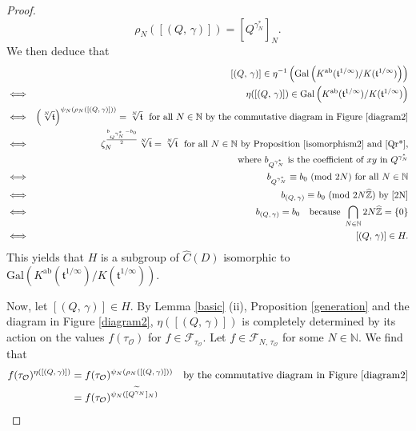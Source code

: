 \documentclass[reqno,11pt]{article}
\newcommand{\Mod}[1]{\ (\textup{mod}\ #1)}
\theoremstyle{plain} %
\theoremstyle{definition} %
\begin{document}
\begin{proof}
\begin{equation}
\rho_N([(Q,\,\gamma)])=
[Q^{\gamma^*_N}]_N. 
\end{equation}
We then deduce that
\begin{eqnarray*}
&&[(Q,\,\gamma)]\in\eta^{-1}\left(\mathrm{Gal}\left(K^\mathrm{ab}(\mathfrak{t}^{1/\infty})/K(\mathfrak{t}^{1/\infty})\right)\right)\\
&\Longleftrightarrow&\eta([(Q,\,\gamma)])\in\mathrm{Gal}\left(K^\mathrm{ab}(\mathfrak{t}^{1/\infty})/K(\mathfrak{t}^{1/\infty})\right)\\
&\Longleftrightarrow&\left(\sqrt[N]{\mathfrak{t}}\right)^{\psi_N(\rho_N([(Q,\,\gamma)]))}=\sqrt[N]{\mathfrak{t}}
~~\textrm{for all}~N\in\mathbb{N}~
\textrm{by the commutative diagram in Figure \ref{diagram2}}\\
&\Longleftrightarrow&\zeta_N^{\frac{b_{Q^{\gamma^*_N}}-b_0}{2}}\sqrt[N]{\mathfrak{t}}=\sqrt[N]{\mathfrak{t}}~~
\textrm{for all $N\in\mathbb{N}$ by Proposition \ref{isomorphism2} and \eqref{Qr*}},\\
&&\hspace{3.4cm}\textrm{where $b_{Q^{\gamma^*_N}}$
is the coefficient of $xy$ in $Q^{\gamma^*_N}$}\\
&\Longleftrightarrow&
b_{Q^{\gamma^*_N}}\equiv b_0\Mod{2N}~\textrm{for all}~N\in\mathbb{N}\\
&\Longleftrightarrow&b_{(Q,\,\gamma)}\equiv b_0\Mod{2N\widehat{\mathbb{Z}}}~\textrm{by \eqref{2N}}\\
&\Longleftrightarrow&b_{(Q,\,\gamma)}=b_0\quad
\textrm{because}~\bigcap_{N\in\mathbb{N}}2N\widehat{\mathbb{Z}}=\{0\}\\
&\Longleftrightarrow&[(Q,\,\gamma)]\in H. 
\end{eqnarray*}
This yields that
$H$ is a subgroup of $\widehat{C}(D)$ isomorphic to 
$\mathrm{Gal}\left(K^\mathrm{ab}(\mathfrak{t}^{1/\infty})/K(\mathfrak{t}^{1/\infty})\right)$. 
\par
Now, let $[(Q,\,\gamma)]\in H$. 
By Lemma \ref{basic} (ii), Proposition \ref{generation} and the diagram in
Figure \ref{diagram2}, $\eta([(Q,\,\gamma)])$ is completely determined by
its action on the values $f(\tau_{\mathcal{O}})$ for
$f\in\mathcal F_{\tau_{\mathcal O}}$.
Let $f\in\mathcal{F}_{N,\,\tau_\mathcal{O}}$ for some $N\in\mathbb{N}$. 
We find that
\begin{align*}
f(\tau_\mathcal{O})^{\eta([(Q,\,\gamma)])}&=
f(\tau_\mathcal{O})^{\psi_N(\rho_N([(Q,\,\gamma)]))}
\quad\textrm{by the commutative diagram in Figure \ref{diagram2}}\\
&=f(\tau_\mathcal{O})^{\psi_N([Q^{\widetilde{\gamma}_N}]_N)}\\

\end{align*}
\end{proof}
\end{document}
